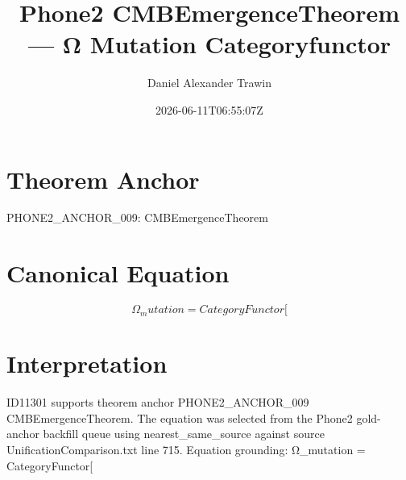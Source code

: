\documentclass[11pt]{article}
\title{Phone2 CMBEmergenceTheorem — Ω Mutation Categoryfunctor}
\author{Daniel Alexander Trawin}
\date{2026-06-11T06:55:07Z}
\begin{document}
\maketitle
\section*{Theorem Anchor}
PHONE2_ANCHOR_009: CMBEmergenceTheorem
\section*{Canonical Equation}
\[
Ω_mutation = CategoryFunctor[
\]
\section*{Interpretation}
ID11301 supports theorem anchor PHONE2_ANCHOR_009 CMBEmergenceTheorem. The equation was selected from the Phone2 gold-anchor backfill queue using nearest_same_source against source UnificationComparison.txt line 715. Equation grounding: Ω_mutation = CategoryFunctor[
\end{document}
